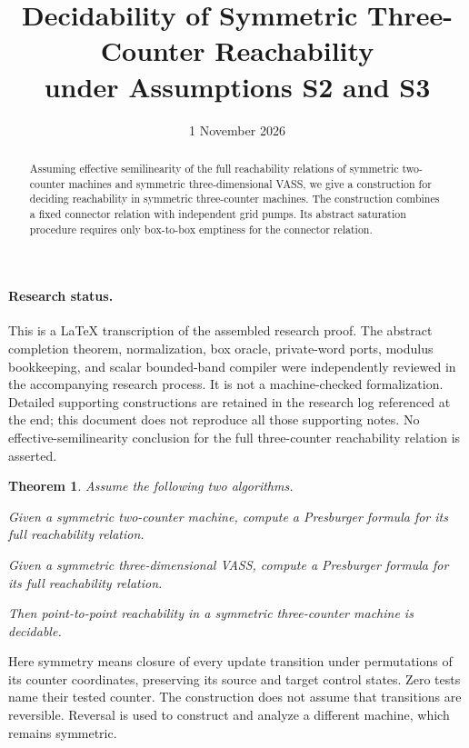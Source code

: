 \documentclass[11pt,a4paper]{article}
\title{Decidability of Symmetric Three-Counter Reachability\\
under Assumptions S2 and S3}
\author{}
\date{1 November 2026}
\newtheorem{theorem}{Theorem}
\theoremstyle{remark}
\begin{document}
\maketitle

\begin{abstract}
Assuming effective semilinearity of the full reachability relations of
symmetric two-counter machines and symmetric three-dimensional VASS,
we give a construction for deciding reachability in symmetric
three-counter machines. The construction combines a fixed connector
relation with independent grid pumps. Its abstract saturation procedure
requires only box-to-box emptiness for the connector relation.
\end{abstract}

\paragraph{Research status.}
This is a LaTeX transcription of the assembled research proof.
The abstract completion theorem, normalization, box oracle, private-word
ports, modulus bookkeeping, and scalar bounded-band compiler were
independently reviewed in the accompanying research process.
It is not a machine-checked formalization. Detailed supporting constructions
are retained in the research log referenced at the end; this document
does not reproduce all those supporting notes.
No effective-semilinearity conclusion for the full three-counter
reachability relation is asserted.

\begin{theorem}\label{thm:main}
Assume the following two algorithms.
\begin{description}[leftmargin=2.8em,style=nextline]
\item[\textnormal{\textbf{S2}}] Given a symmetric two-counter machine,
compute a Presburger formula for its full reachability relation.
\item[\textnormal{\textbf{S3}}] Given a symmetric three-dimensional VASS,
compute a Presburger formula for its full reachability relation.
\end{description}
Then point-to-point reachability in a symmetric three-counter machine
is decidable.
\end{theorem}


Here symmetry means closure of every update transition under permutations of its counter coordinates, preserving its source and target control states. Zero tests name their tested counter. The construction does not assume that transitions are reversible. Reversal is used to construct and analyze a different machine, which remains symmetric.
\end{document}
